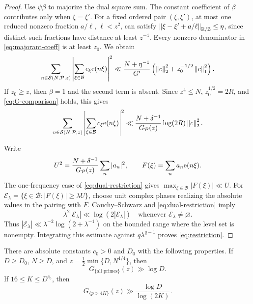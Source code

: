 \begin{proof}
Use \(\psi\beta\) to majorize the dual square sum. The constant
coefficient of \(\beta\) contributes only when \(\xi=\xi'\).
For a fixed ordered pair \((\xi,\xi')\), at most one reduced
nonzero fraction \(a/\ell\), \(\ell<z^2\), can satisfy
\(\left\lVert \xi-\xi'+a/\ell\right\rVert_{\mathbb R/\mathbb Z}\le\eta\), since distinct such
fractions have distance at least \(z^{-4}\).
Every nonzero denominator in \eqref{eq:majorant-coeff} is at
least \(z_0\). We obtain
\[
 \sum_{n\in\mathcal S(N,\mathcal P,z)}
      \left|\sum_{\xi\in\mathcal B}c_\xi\mathrm e(n\xi)\right|^2
 \ll\frac{N+\eta^{-1}}{G'}
       \left(\left\lVert c\right\rVert_2^2+z_0^{-1/2}\left\lVert c\right\rVert_1^2\right).
\]
If \(z_0\ge z\), then \(\beta=1\) and the second term is absent.
Since \(z^4\le N\), \(z_0^{1/2}=2R\), and
\eqref{eq:G-comparison} holds, this gives
\begin{equation}\label{eq:dual-restriction}
 \sum_{n\in\mathcal S(N,\mathcal P,z)}
      \left|\sum_{\xi\in\mathcal B}c_\xi\mathrm e(n\xi)\right|^2
 \ll \frac{N+\delta^{-1}}{G_{\mathcal P}(z)}
                \log(2R)\left\lVert c\right\rVert_2^2.
\end{equation}

Write
\[
 U^2=\frac{N+\delta^{-1}}{G_{\mathcal P}(z)}
                 \sum_n|a_n|^2,\qquad
 F(\xi)=\sum_n a_n\mathrm e(n\xi).
\]
The one-frequency case of \eqref{eq:dual-restriction} gives
\(\max_{\xi\in\mathcal B}|F(\xi)|\ll U\).
For \(\mathcal E_\lambda=\{\xi\in\mathcal B:|F(\xi)|\ge\lambda U\}\),
choose unit complex phases realizing the absolute values in the
pairing with \(F\). Cauchy--Schwarz and
\eqref{eq:dual-restriction} imply
\[
 \lambda^2|\mathcal E_\lambda|
      \ll\log(2|\mathcal E_\lambda|)
 \quad\text{whenever }\mathcal E_\lambda\ne\varnothing.
\]
Thus
\(
 |\mathcal E_\lambda|
 \ll\lambda^{-2}\log(2+\lambda^{-1})
\)
on the bounded range where the level set is nonempty.
Integrating this estimate against \(q\lambda^{q-1}\) proves
\eqref{eq:restriction}.
\end{proof}

\begin{lemma}\label{lem:sieve-density}
There are absolute constants \(c_0>0\) and \(D_0\) with the
following properties. If \(D\ge D_0\), \(N\ge D\), and
\(z=\tfrac12\min\{D,N^{1/4}\}\), then
\begin{equation}\label{eq:full-density}
 G_{\{\text{all primes}\}}(z)\gg\log D.
\end{equation}
If \(16\le K\le D^{c_0}\), then
\begin{equation}\label{eq:band-density}
 G_{\{p>4K\}}(z)\gg\frac{\log D}{\log(2K)}.
\end{equation}
\end{lemma}

